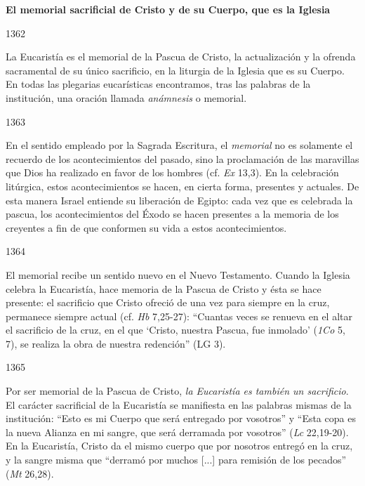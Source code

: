 			\begin{ccebody}\textbf{El memorial sacrificial de Cristo y de su Cuerpo, que es la Iglesia}\end{ccebody}
			
			\begin{ccebody}\begin{ccenumber}1362\end{ccenumber} La Eucaristía es el memorial de la Pascua de Cristo, la actualización y la ofrenda sacramental de su único sacrificio, en la liturgia de la Iglesia que es su Cuerpo. En todas las plegarias eucarísticas encontramos, tras las palabras de la institución, una oración llamada \textit{anámnesis} o memorial.\end{ccebody}
			
			\begin{ccebody}\begin{ccenumber}1363\end{ccenumber} En el sentido empleado por la Sagrada Escritura, el \textit{memorial} no es solamente el recuerdo de los acontecimientos del pasado, sino la proclamación de las maravillas que Dios ha realizado en favor de los hombres (cf. \textit{Ex} 13,3). En la celebración litúrgica, estos acontecimientos se hacen, en cierta forma, presentes y actuales. De esta manera Israel entiende su liberación de Egipto: cada vez que es celebrada la pascua, los acontecimientos del Éxodo se hacen presentes a la memoria de los creyentes a fin de que conformen su vida a estos acontecimientos.\end{ccebody}
			
			\begin{ccebody}\begin{ccenumber}1364\end{ccenumber} El memorial recibe un sentido nuevo en el Nuevo Testamento. Cuando la Iglesia celebra la Eucaristía, hace memoria de la Pascua de Cristo y ésta se hace presente: el sacrificio que Cristo ofreció de una vez para siempre en la cruz, permanece siempre actual (cf. \textit{Hb} 7,25-27): “Cuantas veces se renueva en el altar el sacrificio de la cruz, en el que ‘Cristo, nuestra Pascua, fue inmolado’ (\textit{1Co} 5, 7), se realiza la obra de nuestra redención” (LG 3).\end{ccebody}
			
			\begin{ccebody}\begin{ccenumber}1365\end{ccenumber} Por ser memorial de la Pascua de Cristo, \textit{la Eucaristía es también un sacrificio}. El carácter sacrificial de la Eucaristía se manifiesta en las palabras mismas de la institución: “Esto es mi Cuerpo que será entregado por vosotros” y “Esta copa es la nueva Alianza en mi sangre, que será derramada por vosotros” (\textit{Lc} 22,19-20). En la Eucaristía, Cristo da el mismo cuerpo que por nosotros entregó en la cruz, y la sangre misma que “derramó por muchos [...] para remisión de los pecados” (\textit{Mt} 26,28).\end{ccebody}
			
